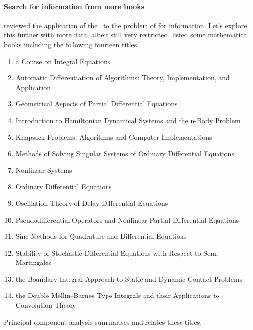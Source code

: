 \paragraph{Search for information from more books}
\cite{Berry95} reviewed the application of the \svd\ to the problem of  for information.
Let's explore this further with more data, albeit still very restricted.
\cite{Berry95} listed some mathematical books including the following fourteen titles.
\begin{enumerate}
\item a Course on Integral Equations
\item Automatic Differentiation of Algorithms: Theory, Implementation, and Application
\item Geometrical Aspects of Partial Differential Equations
\item Introduction to Hamiltonian Dynamical Systems and the n-Body Problem
\item Knapsack Problems: Algorithms and Computer Implementations 
\item Methods of Solving Singular Systems of Ordinary Differential Equations
\item Nonlinear Systems
\item Ordinary Differential Equations
\item Oscillation Theory of Delay Differential Equations 
\item Pseudodifferential Operators and Nonlinear Partial Differential Equations
\item Sinc Methods for Quadrature and Differential Equations 
\item Stability of Stochastic Differential Equations with Respect to Semi-Martingales
\item the Boundary Integral Approach to Static and Dynamic Contact Problems
\item the Double Mellin--Barnes Type Integrals and their Applications to Convolution Theory
\end{enumerate}
Principal component analysis summarises and relates these titles.

